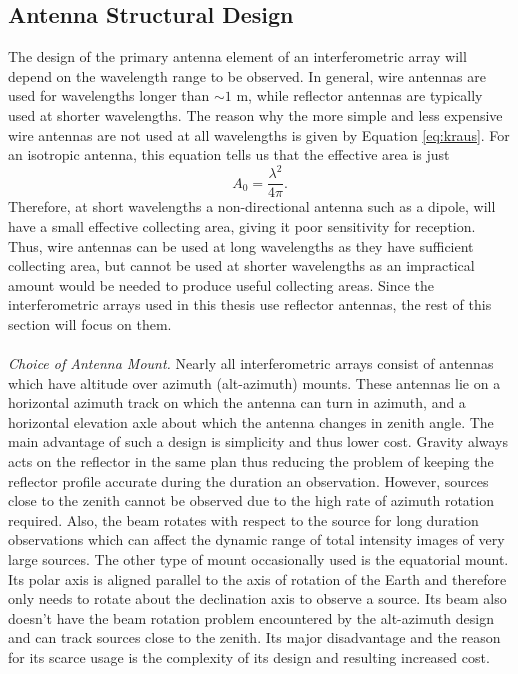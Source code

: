 \subsection{Antenna Structural Design}\label{subsec:2}
The design of the primary antenna element of an interferometric array will depend on the wavelength range to be observed. In general, wire antennas are used for wavelengths longer than $\sim 1$ m, while reflector antennas are typically used at shorter wavelengths. The reason why the more simple and less expensive wire antennas are not used at all wavelengths is given by Equation \ref{eq:kraus}. For an isotropic antenna, this equation tells us that the effective area is just
\begin{equation}
A_{0} = \frac{\lambda ^2}{4\pi}.
\end{equation}
Therefore, at short wavelengths a non-directional antenna such as a dipole, will have a small effective collecting area, giving it poor sensitivity for reception. Thus, wire antennas can be used at long wavelengths as they have sufficient collecting area, but cannot be used at shorter wavelengths as an impractical amount would be needed to produce useful collecting areas. Since the interferometric arrays used in this thesis use reflector antennas, the rest of this section will focus on them.\\
\\
\textit{Choice of Antenna Mount.} Nearly all interferometric arrays consist of antennas which have altitude over azimuth (alt-azimuth) mounts. These antennas lie on a horizontal azimuth track on which the antenna can turn in azimuth, and a horizontal elevation axle about which the antenna changes in zenith angle. The main advantage of such a design is simplicity and thus lower cost. Gravity always acts on the reflector in the same plan thus reducing the problem of keeping the reflector profile accurate during the duration an observation. However, sources close to the zenith cannot be observed due to the high rate of azimuth rotation required. Also, the beam rotates with respect to the source for long duration observations which can affect the dynamic range of total intensity images of very large sources. The other type of mount occasionally used is the equatorial mount. Its polar axis is aligned parallel to the axis of rotation of the Earth and therefore only needs to rotate about the declination axis to observe a source. Its beam also doesn't have the beam rotation problem encountered by the alt-azimuth design and can track sources close to the zenith. Its major disadvantage and the reason for its scarce usage is the complexity of its design and resulting increased cost. \\
